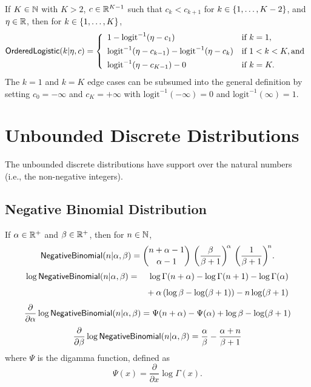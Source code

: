 If $K \in \mathbb{N}$ with $K > 2$, $c \in \mathbb{R}^{K-1}$ such that $c_k <
c_{k+1}$ for $k \in \{ 1,\ldots,K-2 \}$, and $\eta \in \mathbb{R}$, then for $k \in
\{ 1,\ldots,K \}$,
\[
\mbox{\sf OrderedLogistic}(k|\eta,c)
=
\left\{
\begin{array}{ll}
1 - \mbox{logit}^{-1}(\eta - c_1) & \mbox{if } k = 1,
\\[4pt]
\mbox{logit}^{-1}(\eta - c_{k-1}) - \mbox{logit}^{-1}(\eta -
c_{k})
& \mbox{if } 1 < k < K, \mbox{and}
\\[4pt]
\mbox{logit}^{-1}(\eta - c_{K-1}) - 0
& \mbox{if } k = K.
\end{array}
\right.
\]
%
The $k=1$ and $k=K$ edge cases can be subsumed into the general definition
by setting $c_0 = -\infty$ and $c_K = +\infty$ with
$\mbox{logit}^{-1}(-\infty) = 0$ and $\mbox{logit}^{-1}(\infty) = 1$.
%
\begin{description}
\end{description}


\section{Unbounded Discrete Distributions}

The unbounded discrete distributions have support over the natural
numbers (i.e., the non-negative integers).

\subsection{Negative Binomial Distribution}

If $\alpha \in \mathbb{R}^+$ and $\beta \in \mathbb{R}^+$, then for $n \in
\mathbb{N}$,
\[
\mbox{\sf NegativeBinomial}(n|\alpha,\beta)
 = 
{{n + \alpha - 1} \choose {\alpha - 1}}
\,
\left( \frac{\beta}{\beta+1} \right)^{\!\alpha}
\,
\left( \frac{1}{\beta + 1} \right)^{\!n} \!.
\]
\begin{eqnarray*}
\log \mbox{\sf NegativeBinomial}(n|\alpha,\beta)
& = & \log \Gamma(n + \alpha) 
  - \log \Gamma(n + 1)
  - \log \Gamma(\alpha)
\\[4pt]
& & 
  {} + \alpha \left(\log \beta - \log (\beta + 1) \right)
  - n \log (\beta + 1)
\end{eqnarray*}
\[
\frac{\partial}{\partial \alpha} 
\log \mbox{\sf NegativeBinomial}(n|\alpha,\beta)
= \Psi(n + \alpha)
- \Psi(\alpha)
+ \log \beta
- \log (\beta + 1)
\]
\[
\frac{\partial}{\partial \beta} 
\log \mbox{\sf NegativeBinomial}(n|\alpha,\beta)
= \frac{\alpha}{\beta} - \frac{\alpha + n}{\beta + 1}
\]
where $\Psi$ is the digamma function, defined as
\[
\Psi(x) = \frac{\partial}{\partial x} \log \Gamma(x).
\]

